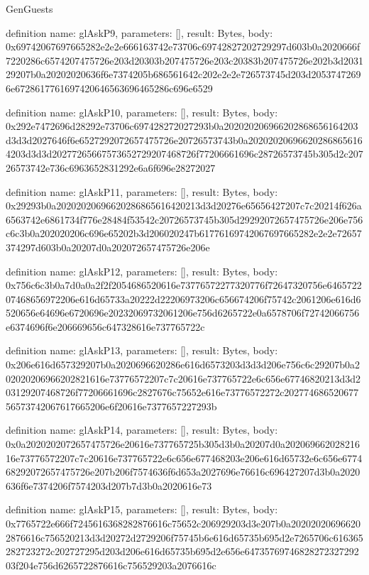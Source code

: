 \begin{lexlean}{GenGuests}
\begin{semanticmodule}
definition{
  name: glAskP9,
  parameters: [],
  result: Bytes,
  body: 0x69742067697665282e2e2e666163742e73706c69742827202729297d603b0a2020666f7220286c6574207475726e203d20303b207475726e203c20383b207475726e202b3d203129207b0a20202020636f6e7374205b686561642c202e2e2e726573745d203d20537472696e6728617761697420646563696465286c696e6529
}

definition{
  name: glAskP10,
  parameters: [],
  result: Bytes,
  body: 0x292e7472696d28292e73706c697428272027293b0a202020206966202868656164203d3d3d2027646f6e6527292072657475726e20726573743b0a202020206966202868656164203d3d3d20277265667573652729207468726f77206661696c28726573745b305d2c20726573742e736c6963652831292e6a6f696e28272027
}

definition{
  name: glAskP11,
  parameters: [],
  result: Bytes,
  body: 0x29293b0a20202020696620286865616420213d3d20276e65656427207c7c20214f626a6563742e6861734f776e28484f53542c20726573745b305d29292072657475726e206e756c6c3b0a202020206c696e65202b3d206020247b61776169742067697665282e2e2e72657374297d603b0a20207d0a202072657475726e206e
}

definition{
  name: glAskP12,
  parameters: [],
  result: Bytes,
  body: 0x756c6c3b0a7d0a0a2f2f2054686520616e73776572277320776f72647320756e646572207468656972206e616d65733a20222d22206973206c656674206f75742c2061206e616d6520656e64696e6720696e20232069732061206e756d6265722e0a6578706f72742066756e6374696f6e206669656c647328616e737765722c
}

definition{
  name: glAskP13,
  parameters: [],
  result: Bytes,
  body: 0x206e616d657329207b0a2020696620286e616d6573203d3d3d206e756c6c29207b0a202020206966202821616e73776572207c7c20616e737765722e6c656e67746820213d3d203129207468726f77206661696c2827676c75652e616e73776572272c20277468652067756573742067617665206e6f20616e7377657227293b
}

definition{
  name: glAskP14,
  parameters: [],
  result: Bytes,
  body: 0x0a2020202072657475726e20616e737765725b305d3b0a20207d0a20206966202821616e73776572207c7c20616e737765722e6c656e677468203e206e616d65732e6c656e677468292072657475726e207b206f7574636f6d653a2027696e76616c696427207d3b0a2020636f6e7374206f7574203d207b7d3b0a2020616e73
}

definition{
  name: glAskP15,
  parameters: [],
  result: Bytes,
  body: 0x7765722e666f7245616368282876616c75652c206929203d3e207b0a202020206966202876616c756520213d3d20272d2729206f75745b6e616d65735b695d2e7265706c616365282723272c202727295d203d206e616d65735b695d2e656e6473576974682827232729203f204e756d6265722876616c756529203a2076616c
}


\end{semanticmodule}
\end{lexlean}
